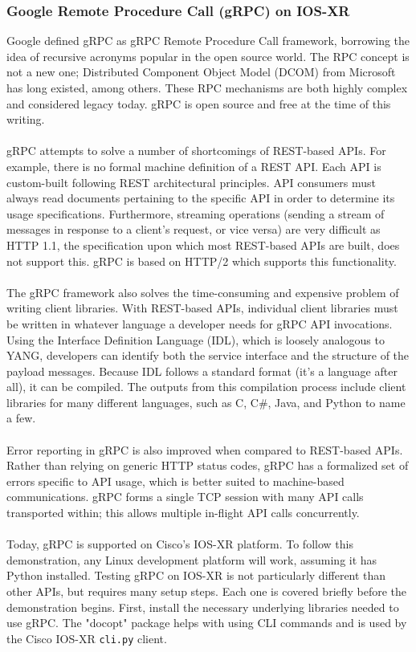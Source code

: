 \subsubsection{Google Remote Procedure Call (gRPC) on IOS-XR}
Google defined gRPC as gRPC Remote Procedure Call framework, borrowing the
idea of recursive acronyms popular in the open source world. The RPC concept
is not a new one; Distributed Component Object Model (DCOM) from Microsoft has
long existed, among others. These RPC mechanisms are both highly complex and
considered legacy today. gRPC is open source and free at the time of this
writing.
\\ \\
gRPC attempts to solve a number of shortcomings of REST-based APIs. For
example, there is no formal machine definition of a REST API. Each API is
custom-built following REST architectural principles. API consumers must
always read documents pertaining to the specific API in order to determine its
usage specifications. Furthermore, streaming operations (sending a stream of
messages in response to a client's request, or vice versa) are very difficult
as HTTP 1.1, the specification upon which most REST-based APIs are built, does
not support this. gRPC is based on HTTP/2 which supports this functionality.
\\ \\
The gRPC framework also solves the time-consuming and expensive problem of
writing client libraries. With REST-based APIs, individual client libraries
must be written in whatever language a developer needs for gRPC API
invocations. Using the Interface Definition Language (IDL), which is loosely
analogous to YANG, developers can identify both the service interface and the
structure of the payload messages. Because IDL follows a standard format (it's
a language after all), it can be compiled. The outputs from this compilation
process include client libraries for many different languages, such as C, C\#,
Java, and Python to name a few.
\\ \\
Error reporting in gRPC is also improved when compared to REST-based APIs.
Rather than relying on generic HTTP status codes, gRPC has a formalized set of
errors specific to API usage, which is better suited to machine-based
communications. gRPC forms a single TCP session with many API calls
transported within; this allows multiple in-flight API calls concurrently.
\\ \\
Today, gRPC is supported on Cisco's IOS-XR platform. To follow this
demonstration, any Linux development platform will work, assuming it has
Python installed. Testing gRPC on IOS-XR is not particularly different than
other APIs, but requires many setup steps. Each one is covered briefly before
the demonstration begins. First, install the necessary underlying libraries
needed to use gRPC. The "docopt" package helps with using CLI commands and is
used by the Cisco IOS-XR \verb|cli.py| client.
\\ \\

